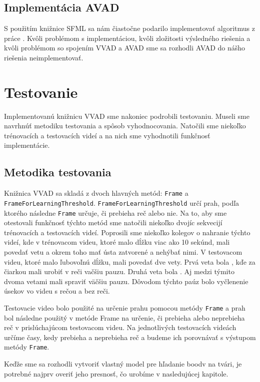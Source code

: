 \section{Implementácia AVAD}
S použitím knižnice SFML \cite{SFML} sa nám čiastočne podarilo implementovať algoritmus z práce  \cite{moattar2009simple}. 
Kvôli problémom s implementáciou, kvôli zložitosti výsledného riešenia a kvôli problémom so spojením VVAD a AVAD sme sa rozhodli AVAD do nášho riešenia neimplementovať.

\chapter{Testovanie}
Implementovanú knižnicu VVAD sme nakoniec podrobili testovaniu.
Museli sme navrhnúť metodiku testovania a spôsob vyhodnocovania. 
Natočili sme niekoľko trénovacích a testovacích videí a na nich sme vyhodnotili funkčnosť implementácie. 

\section{Metodika testovania}
Knižnica VVAD sa skladá z dvoch hlavných metód: \texttt{Frame} a \texttt{Frame\-For\-Learning\-Threshold}. 
\texttt{Frame\-For\-Learning\-Threshold} určí prah, podľa ktorého následne \texttt{Frame} určuje, či prebieha reč alebo nie.
Na to, aby sme otestovali funkčnosť týchto metód sme natočili niekoľko dvojíc sekvecijí trénovacích a testovacích videí. 
Poprosili sme niekoľko kolegov o nahranie týchto videí, kde v trénovacom videu, ktoré malo dĺžku viac ako 10 sekúnd, mali povedať vetu  a okrem toho mať ústa zatvorené a nehýbať nimi.
V testovacom videu, ktoré malo ľubovoľnú dĺžku, mali povedať dve vety. Prvá veta bola , kďe za čiarkou mali urobiť v reči vačšiu pauzu. 
Druhá veta bola . 
Aj medzi týmito dvoma vetami mali spraviť väčšiu pauzu. 
Dôvodom týchto paúz bolo vyčlenenie úsekov vo videu s rečou a bez reči.

Testovacie video bolo použité na určenie prahu pomocou metódy \texttt{Frame} a prah bol následne použitý v metóde Frame na určenie, či prebieha alebo neprebieha reč v prislúchajúcom testovacom videu. 
Na jednotlivých testovacích videách určíme časy, kedy prebieha a neprebieha reč a budeme ich porovnávať s výstupom metódy \texttt{Frame}.

Keďže sme sa rozhodli vytvoriť vlastný model pre hľadanie boodv na tvári, je potrebné najprv overiť jeho presnosť, čo urobíme v nasledujúcej kapitole. 


